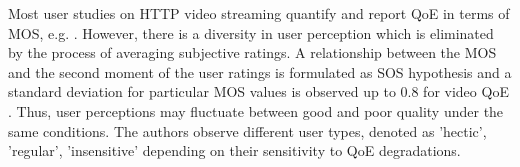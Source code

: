 Most user studies on \gls{HTTP} video streaming quantify and report \gls{QoE} in terms of \gls{MOS}, e.g. \cite{Hossfeld2013c}.
However, there is a diversity in user perception which is eliminated by the process of averaging subjective ratings.
A relationship between the \gls{MOS} and the second moment of the user ratings is formulated as \gls{SOS} hypothesis and a standard deviation for particular \gls{MOS} values is observed up to 0.8 for video \gls{QoE} \cite{Hossfeld2011b}. 
Thus, user perceptions may fluctuate between good and poor quality under the same conditions. The authors observe different user types, denoted as 'hectic', 'regular', 'insensitive' depending on their sensitivity to \gls{QoE} degradations.
